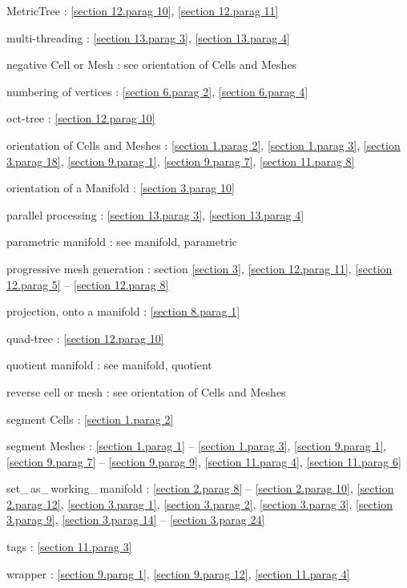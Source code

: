 \documentclass[a4paper]{scrreprt}
\def\numb{}
\newcommand\verm[1]{\textcolor{manif}{#1}}
\renewcommand\tt{\normalfont\ttfamily}
\begin{document}
\noindent
{\small\tt \verm{MetricTree}} : \ref{\numb section 12.\numb parag 10},
\ref{\numb section 12.\numb parag 11}

\noindent
multi-threading : \ref{\numb section 13.\numb parag 3}, \ref{\numb section 13.\numb parag 4}

\noindent
negative {\small\tt \verm{Cell}} or {\small\tt \verm{Mesh}} :
see orientation of {\small\tt \verm{Cell}}s and {\small\tt \verm{Mesh}}es

\noindent
numbering of vertices :
\ref{\numb section 6.\numb parag 2}, \ref{\numb section 6.\numb parag 4}

\noindent
oct-tree : \ref{\numb section 12.\numb parag 10}

\noindent
orientation of {\small\tt \verm{Cell}}s and {\small\tt \verm{Mesh}}es :
\ref{\numb section 1.\numb parag 2}, \ref{\numb section 1.\numb parag 3},
\ref{\numb section 3.\numb parag 18}, \ref{\numb section 9.\numb parag 1},
\ref{\numb section 9.\numb parag 7}, \ref{\numb section 11.\numb parag 8}

\noindent
orientation of a {\small\tt \verm{Manifold}} : \ref{\numb section 3.\numb parag 10}

\noindent
parallel processing : \ref{\numb section 13.\numb parag 3}, \ref{\numb section 13.\numb parag 4}

\noindent
parametric manifold : see manifold, parametric

\noindent
progressive mesh generation : section \ref{\numb section 3},
\ref{\numb section 12.\numb parag 11},
\ref{\numb section 12.\numb parag 5} -- \ref{\numb section 12.\numb parag 8}

\noindent
projection, onto a manifold :
\ref{\numb section 8.\numb parag 1}

\noindent
quad-tree : \ref{\numb section 12.\numb parag 10}

\noindent
quotient manifold : see manifold, quotient

\noindent
reverse cell or mesh : see orientation of {\small\tt \verm{Cell}}s and {\small\tt \verm{Mesh}}es

\noindent
segment {\small\tt \verm{Cell}}s : \ref{\numb section 1.\numb parag 2}

\noindent
segment {\small\tt \verm{Mesh}}es :
\ref{\numb section 1.\numb parag 1} -- \ref{\numb section 1.\numb parag 3},
\ref{\numb section 9.\numb parag 1}, \ref{\numb section 9.\numb parag 7} --
\ref{\numb section 9.\numb parag 9}, \ref{\numb section 11.\numb parag 4},
\ref{\numb section 11.\numb parag 6}

\noindent
{\small\tt set\_\,as\_\,working\_\,manifold} :
\ref{\numb section 2.\numb parag 8} -- \ref{\numb section 2.\numb parag 10},
\ref{\numb section 2.\numb parag 12}, \ref{\numb section 3.\numb parag 1},
\ref{\numb section 3.\numb parag 2}, \ref{\numb section 3.\numb parag 3},
\ref{\numb section 3.\numb parag 9},
\ref{\numb section 3.\numb parag 14} -- \ref{\numb section 3.\numb parag 24}

\noindent
{\small\tt\verm{tag}}s : \ref{\numb section 11.\numb parag 3}

\noindent
wrapper : \ref{\numb section 9.\numb parag 1}, \ref{\numb section 9.\numb parag 12},
\ref{\numb section 11.\numb parag 4}
\end{document}
